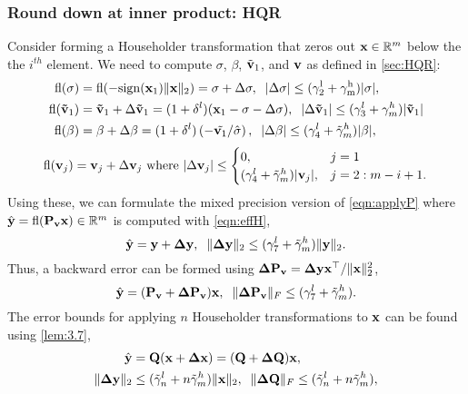 \subsubsection{Round down at inner product: HQR}
Consider forming a Householder transformation that zeros out $\mathbf{x}\in\mathbb{R}^m$ below the the $i^{th}$ element. 
We need to compute $\sigma$, $\beta$, $\tilde{\mathbf{v}}_1$, and $\mathbf{v}$ as defined in \cref{sec:HQR}:
\begin{align}
\fl(\sigma) &= \rm{fl}(-\rm{sign}(\bb{x}_1)\|\bb{x}\|_2) = \sigma + \Delta \sigma,\;\;|\Delta\sigma| \leq (\gamma_{2}^l+\gamma_{m}^h)|\sigma|,\label{eqn:mpsigma}\\
\fl(\bb{\tilde{v}}_1)& =\bb{\tilde{v}}_1 + \Delta \bb{\tilde{v}}_1 = (1+\dd^l) (\bb{x}_{1}-\sigma-\Delta\sigma), \;\;|\Delta\bb{\tilde{v}}_1| \leq (\gamma_{3}^l+\gamma_{m}^h)|\bb{\tilde{v}}_1| \label{eqn:mpv1}\\
\fl(\beta) &= \beta +\Delta \beta= (1+\dd^l)\left(-\tilde{\bb{v}_1}/\hat{\sigma}\right), \;\; |\Delta\beta| \leq (\gamma_{4}^l+\tilde{\gamma}_{m}^h)|\beta|, \label{eqn:mpbeta}
\end{align}
\begin{equation}
	\fl(\bb{v}_j)	= \bb{v}_j + \Delta \bb{v}_j\text{ where }|\Delta \bb{v}_j|\leq 
	\begin{cases}
	0,& j=1\\
	(\gamma_{4}^l + \tilde{\gamma}_{m}^h)|\bb{v}_j|,&j=2:m-i+1.
	\end{cases}  \label{eqn:mpv}
\end{equation}
Using these, we can formulate the mixed precision version of \cref{eqn:applyP} where $\hat{\mathbf{y}}=\mathrm{fl}(\mathbf{P_vx})\in\mathbb{R}^m$ is computed with \cref{eqn:effH},
\begin{equation}
	\hat{\mathbf{y}} = \mathbf{y}+\mathbf{\Delta y},\;\; \|\mathbf{\Delta y}\|_2 \leq (\gamma_7^l + \tilde{\gamma}_{m}^h)\|\mathbf{y}\|_2.
\end{equation}
Thus, a backward error can be formed using $\mathbf{\Delta P_v} = \mathbf{\Delta y}\mathbf{x}^{
\top}/\|\mathbf{x}\|_2^2$,
\begin{equation}
	\hat{\mathbf{y}} = (\mathbf{P_v} + \mathbf{\Delta P_v})\mathbf{x},\;\; \|\mathbf{\Delta P_v}\|_F\leq (\gamma_7^l + \tilde{\gamma}_{m}^h).
\end{equation}
The error bounds for applying $n$ Householder transformations to $\mathbf{x}$ can be found using \cref{lem:3.7},
\begin{align}
\hat{\bb{y}} &= \bb{Q} (\bb{x} +\bb{\Delta x}) = (\bb{Q} + \bb{\Delta Q})\bb{x},\\
\|\bb{\Delta y}\|_2 &\leq (\tilde{\gamma}_n^l+n\tilde{\gamma}_m^h)\|\bb{x}\|_2,\;\; \|\bb{\Delta Q}\|_F\leq (\tilde{\gamma}_n^l+n\tilde{\gamma}_m^h),\label{eqn:mp19.3}
\end{align} 
